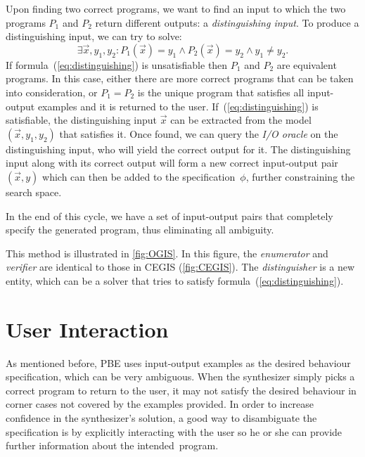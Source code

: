 \noindent
Upon finding two correct programs, we want to find an input to which the two programs \(P_1\) and \(P_2\) return different outputs: a \textit{distinguishing input}. To produce a distinguishing input, we can try to solve:
%
\begin{equation}\label{eq:distinguishing}
  \exists \vec{x}, y_1, y_2: P_1(\vec{x}) = y_1 \wedge P_2(\vec{x}) = y_2 \wedge y_1 \neq y_2.
\end{equation}
%
If formula~(\ref{eq:distinguishing}) is unsatisfiable then \(P_1\) and \(P_2\) are equivalent programs.
In this case, either there are more correct programs that can be taken into consideration, or \(P_1 = P_2\) is the unique program that satisfies all input-output examples and it is returned to the user.
If~(\ref{eq:distinguishing}) is satisfiable, the distinguishing input \(\vec{x}\) can be extracted from the model \((\vec{x}, y_1, y_2)\) that satisfies it.
Once found, we can query the \textit{I/O oracle} on the distinguishing input, who will yield the correct output for it.
The distinguishing input along with its correct output will form a new correct input-output pair \((\vec{x}, y)\) which can then be added to the specification~\(\phi\), further constraining the search space.

In the end of this cycle, we have a set of input-output pairs that completely specify the generated program, thus eliminating all ambiguity.



This method is illustrated in \autoref{fig:OGIS}. In this figure, the \textit{enumerator} and \textit{verifier} are identical to those in \ac{CEGIS} (\autoref{fig:CEGIS}). The \textit{distinguisher} is a new entity, which can be a solver that tries to satisfy formula~(\ref{eq:distinguishing}).


\section{User Interaction} \label{sec:user-interaction}

As mentioned before, \ac{PBE} uses input-output examples as the desired behaviour specification, which can be very ambiguous. When the synthesizer simply picks a correct program to return to the user, it may not satisfy the desired behaviour in corner cases not covered by the examples provided.
In order to increase confidence in the synthesizer's solution, a good way to disambiguate the specification is by explicitly interacting with the user so he or she can provide further information about the intended~program.

